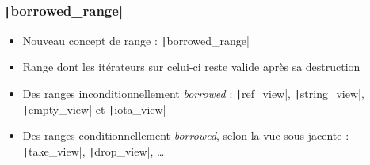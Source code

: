\documentclass[C++.tex]{subfiles}
\begin{document}
\begin{frame}[fragile]

\end{frame}

\begin{frame}[fragile]
	\frametitle{\texttt|borrowed_range|}
	\begin{itemize}
		\item Nouveau concept de range : \texttt|borrowed_range|
		\item Range dont les itérateurs sur celui-ci reste valide après sa destruction
		\item Des ranges inconditionnellement \textit{borrowed} : \texttt|ref_view|, \texttt|string_view|, \texttt|empty_view| et \texttt|iota_view|
		\item Des ranges conditionnellement \textit{borrowed}, selon la vue sous-jacente : \texttt|take_view|, \texttt|drop_view|, \ldots{}
	\end{itemize}

\end{frame}
\end{document}
